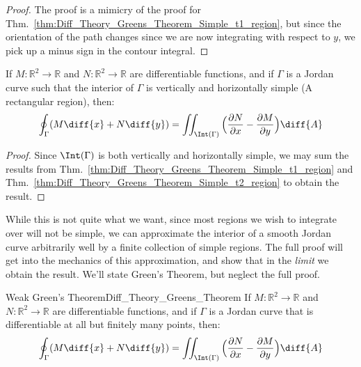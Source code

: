 \documentclass[crop=false,class=book,oneside]{standalone}
\begin{document}
            \begin{proof}
                The proof is a mimicry of the proof for
                Thm.~\ref{thm:Diff_Theory_Greens_Theorem_Simple_t1_region},
                but since the orientation of the path changes since we are
                now integrating with respect to $y$, we pick up a minus sign
                in the contour integral.
            \end{proof}
            \begin{theorem}
                If $M:\mathbb{R}^{2}\rightarrow\mathbb{R}$ and
                $N:\mathbb{R}^{2}\rightarrow\mathbb{R}$ are
                differentiable functions, and if
                $\Gamma$ is a Jordan curve such that the
                interior of $\Gamma$ is vertically and horizontally
                simple (A rectangular region), then:
                \begin{equation}
                    \oint_{\Gamma}(M\diff{x}+N\diff{y})=
                    \iint_{\Int(\Gamma)}\Big(
                    \frac{\partial{N}}{\partial{x}}-
                    \frac{\partial{M}}{\partial{y}}\Big)\diff{A}
                \end{equation}
            \end{theorem}
            \begin{proof}
                Since $\Int(\Gamma)$ is both vertically and horizontally
                simple, we may sum the results from
                Thm.~\ref{thm:Diff_Theory_Greens_Theorem_Simple_t1_region}
                and Thm.~\ref{thm:Diff_Theory_Greens_Theorem_Simple_t2_region}
                to obtain the result.
            \end{proof}
            While this is not quite what we want, since most regions we wish
            to integrate over will not be simple, we can approximate the interior
            of a smooth Jordan curve arbitrarily well by a finite collection of
            simple regions. The full proof will get into the mechanics of this
            approximation, and show that in the \textit{limit} we obtain the
            result. We'll state Green's Theorem, but neglect the full proof.
            \begin{ftheorem}{Weak Green's Theorem}{Diff_Theory_Greens_Theorem}
                If $M:\mathbb{R}^{2}\rightarrow\mathbb{R}$ and
                $N:\mathbb{R}^{2}\rightarrow\mathbb{R}$ are
                differentiable functions, and if
                $\Gamma$ is a Jordan curve that is differentiable at
                all but finitely many points, then:
                \begin{equation}
                    \oint_{\Gamma}(M\diff{x}+N\diff{y})=
                    \iint_{\Int(\Gamma)}\Big(
                    \frac{\partial{N}}{\partial{x}}-
                    \frac{\partial{M}}{\partial{y}}\Big)\diff{A}
                \end{equation}
            \end{ftheorem}
\end{document}
